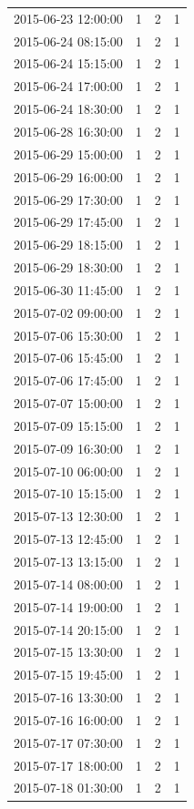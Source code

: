 \begin{tabular}{lrrr}
2015-06-23 12:00:00 & 1 & 2 & 1 \\
2015-06-24 08:15:00 & 1 & 2 & 1 \\
2015-06-24 15:15:00 & 1 & 2 & 1 \\
2015-06-24 17:00:00 & 1 & 2 & 1 \\
2015-06-24 18:30:00 & 1 & 2 & 1 \\
2015-06-28 16:30:00 & 1 & 2 & 1 \\
2015-06-29 15:00:00 & 1 & 2 & 1 \\
2015-06-29 16:00:00 & 1 & 2 & 1 \\
2015-06-29 17:30:00 & 1 & 2 & 1 \\
2015-06-29 17:45:00 & 1 & 2 & 1 \\
2015-06-29 18:15:00 & 1 & 2 & 1 \\
2015-06-29 18:30:00 & 1 & 2 & 1 \\
2015-06-30 11:45:00 & 1 & 2 & 1 \\
2015-07-02 09:00:00 & 1 & 2 & 1 \\
2015-07-06 15:30:00 & 1 & 2 & 1 \\
2015-07-06 15:45:00 & 1 & 2 & 1 \\
2015-07-06 17:45:00 & 1 & 2 & 1 \\
2015-07-07 15:00:00 & 1 & 2 & 1 \\
2015-07-09 15:15:00 & 1 & 2 & 1 \\
2015-07-09 16:30:00 & 1 & 2 & 1 \\
2015-07-10 06:00:00 & 1 & 2 & 1 \\
2015-07-10 15:15:00 & 1 & 2 & 1 \\
2015-07-13 12:30:00 & 1 & 2 & 1 \\
2015-07-13 12:45:00 & 1 & 2 & 1 \\
2015-07-13 13:15:00 & 1 & 2 & 1 \\
2015-07-14 08:00:00 & 1 & 2 & 1 \\
2015-07-14 19:00:00 & 1 & 2 & 1 \\
2015-07-14 20:15:00 & 1 & 2 & 1 \\
2015-07-15 13:30:00 & 1 & 2 & 1 \\
2015-07-15 19:45:00 & 1 & 2 & 1 \\
2015-07-16 13:30:00 & 1 & 2 & 1 \\
2015-07-16 16:00:00 & 1 & 2 & 1 \\
2015-07-17 07:30:00 & 1 & 2 & 1 \\
2015-07-17 18:00:00 & 1 & 2 & 1 \\
2015-07-18 01:30:00 & 1 & 2 & 1 \\

\end{tabular}
